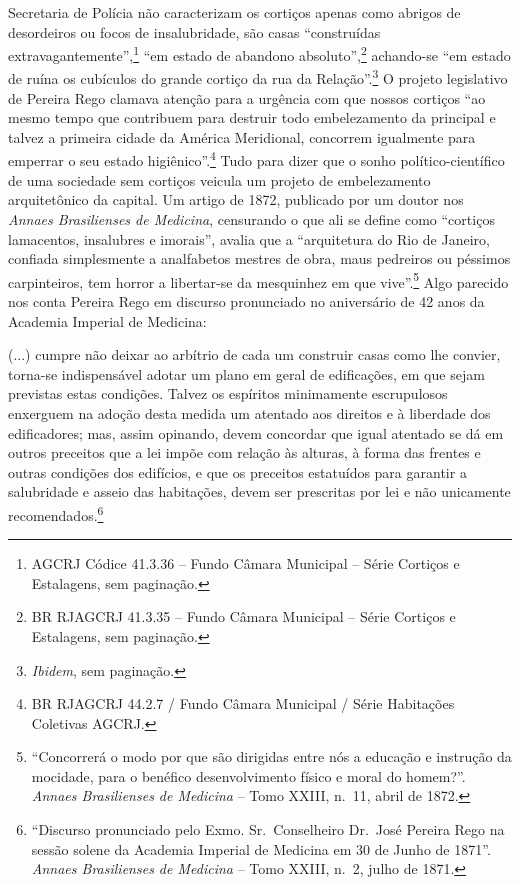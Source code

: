 Secretaria de Polícia não caracterizam os cortiços apenas como abrigos
de desordeiros ou focos de insalubridade, são casas ``construídas
extravagantemente'',\footnote{AGCRJ Códice 41.3.36 -- Fundo Câmara
  Municipal -- Série Cortiços e Estalagens, sem paginação.} ``em estado
de abandono absoluto'',\footnote{BR RJAGCRJ 41.3.35 -- Fundo Câmara
  Municipal -- Série Cortiços e Estalagens, sem paginação.} achando-se
``em estado de ruína os cubículos do grande cortiço da rua da
Relação''.\footnote{\emph{Ibidem}, sem paginação.} O projeto legislativo
de Pereira Rego clamava atenção para a urgência com que nossos cortiços
``ao mesmo tempo que contribuem para destruir todo embelezamento da
principal e talvez a primeira cidade da América Meridional, concorrem
igualmente para emperrar o seu estado higiênico''.\footnote{BR RJAGCRJ
  44.2.7 / Fundo Câmara Municipal / Série Habitações Coletivas AGCRJ.}
Tudo para dizer que o sonho político-científico de uma sociedade sem
cortiços veicula um projeto de embelezamento arquitetônico da capital.
Um artigo de 1872, publicado por um doutor nos \emph{Annaes Brasilienses
de Medicina}, censurando o que ali se define como ``cortiços lamacentos,
insalubres e imorais'', avalia que a ``arquitetura do Rio de Janeiro,
confiada simplesmente a analfabetos mestres de obra, maus pedreiros ou
péssimos carpinteiros, tem horror a libertar-se da mesquinhez em que
vive''.\footnote{``Concorrerá o modo por que são dirigidas entre nós a
  educação e instrução da mocidade, para o benéfico desenvolvimento
  físico e moral do homem?''. \emph{Annaes Brasilienses de Medicina} --
  Tomo XXIII, n.~11, abril de 1872.} Algo parecido nos conta Pereira
Rego em discurso pronunciado no aniversário de 42 anos da Academia
Imperial de Medicina:

(...) cumpre não deixar ao arbítrio de cada um construir casas como lhe
convier, torna-se indispensável adotar um plano em geral de edificações,
em que sejam previstas estas condições. Talvez os espíritos minimamente
escrupulosos enxerguem na adoção desta medida um atentado aos direitos e
à liberdade dos edificadores; mas, assim opinando, devem concordar que
igual atentado se dá em outros preceitos que a lei impõe com relação às
alturas, à forma das frentes e outras condições dos edifícios, e que os
preceitos estatuídos para garantir a salubridade e asseio das
habitações, devem ser prescritas por lei e não unicamente
recomendados.\footnote{``Discurso pronunciado pelo Exmo. Sr.~Conselheiro
  Dr.~José Pereira Rego na sessão solene da Academia Imperial de
  Medicina em 30 de Junho de 1871''. \emph{Annaes Brasilienses de
  Medicina} -- Tomo XXIII, n.~2, julho de 1871.}

